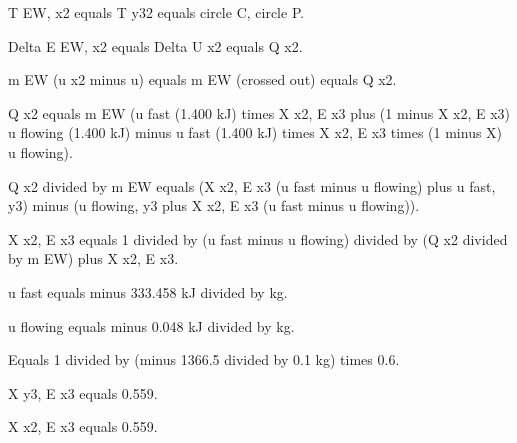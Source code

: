T EW, x2 equals T y32 equals circle C, circle P.

Delta E EW, x2 equals Delta U x2 equals Q x2.

m EW (u x2 minus u) equals m EW (crossed out) equals Q x2.

Q x2 equals m EW (u fast (1.400 kJ) times X x2, E x3 plus (1 minus X x2, E x3) u flowing (1.400 kJ) minus u fast (1.400 kJ) times X x2, E x3 times (1 minus X) u flowing).

Q x2 divided by m EW equals (X x2, E x3 (u fast minus u flowing) plus u fast, y3) minus (u flowing, y3 plus X x2, E x3 (u fast minus u flowing)).

X x2, E x3 equals 1 divided by (u fast minus u flowing) divided by (Q x2 divided by m EW) plus X x2, E x3.

u fast equals minus 333.458 kJ divided by kg.

u flowing equals minus 0.048 kJ divided by kg.

Equals 1 divided by (minus 1366.5 divided by 0.1 kg) times 0.6.

X y3, E x3 equals 0.559.

X x2, E x3 equals 0.559.